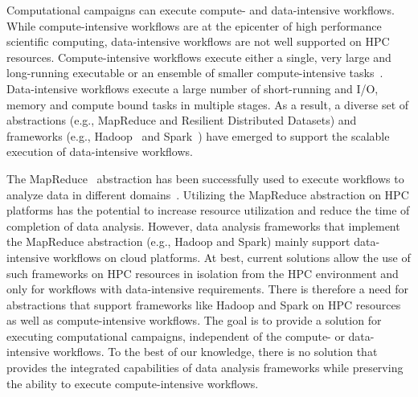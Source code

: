 Computational campaigns can execute compute- and data-intensive workflows. While
compute-intensive workflows are at the epicenter of high performance scientific
computing, data-intensive workflows are not well supported on HPC resources.
Compute-intensive workflows execute either a single, very large and long-running
executable or an ensemble of smaller compute-intensive
tasks~\cite{balasubramanian2018harnessing}. Data-intensive workflows execute a
large number of short-running and I/O, memory and compute bound tasks in
multiple stages. As a result, a diverse set of abstractions (e.g., MapReduce and
Resilient Distributed Datasets) and frameworks (e.g., Hadoop~\cite{hadoop} and
Spark~\cite{zaharia2010spark}) have emerged to support the scalable execution of
data-intensive workflows.



The MapReduce~\cite{dean2004mapreduce} abstraction has been successfully used to
execute workflows to analyze data in different
domains~\cite{hellerstein2012science}. Utilizing the MapReduce abstraction on
HPC platforms has the potential to increase resource utilization and reduce the
time of completion of data analysis. However, data analysis frameworks that
implement the MapReduce abstraction (e.g., Hadoop and Spark) mainly support
data-intensive workflows on cloud platforms. At best, current solutions allow
the use of such frameworks on HPC resources in isolation from the HPC
environment and only for workflows with data-intensive requirements. There is
therefore a need for abstractions that support frameworks like Hadoop and Spark
on HPC resources as well as compute-intensive workflows. The goal is to provide
a solution for executing computational campaigns, independent of the compute- or
data-intensive workflows. To the best of our knowledge, there is no solution
that provides the integrated capabilities of data analysis frameworks while
preserving the ability to execute compute-intensive workflows.

